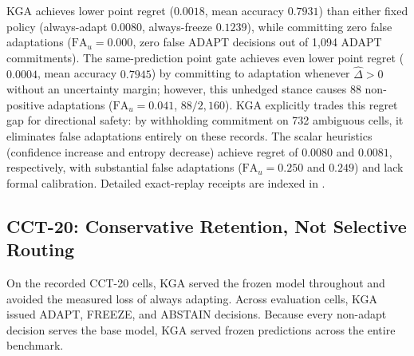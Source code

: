 \begin{table}[t]
\centering
\small
\caption{Current outcome-disjoint saved-feature comparison on 2,160 CIFAR-10-C
Tent rows, generated from one authenticated paired-score authority. All rows
have the same oracle and weights; both fitted gates use identical predictions.
Lower regret is better. $\mathrm{FA}_{\mathrm u}$ is the fraction of all rows
with ADAPT and $B\le0$; commitment is $(A+F)/n$.}
\label{tab:synchronized-baselines}
\resizebox{\textwidth}{!}{}
\end{table}

KGA achieves lower point regret ($0.0018$, mean accuracy $0.7931$) than either fixed policy
(always-adapt $0.0080$, always-freeze $0.1239$), while committing zero false adaptations
($\mathrm{FA}_u = 0.000$, zero false ADAPT decisions out of 1{,}094 ADAPT commitments).
The same-prediction point gate achieves even lower point regret ($0.0004$, mean accuracy $0.7945$)
by committing to adaptation whenever $\widehat\Delta > 0$ without an uncertainty margin;
however, this unhedged stance causes 88 non-positive adaptations ($\mathrm{FA}_u = 0.041$,
$88/2{,}160$). KGA explicitly trades this regret gap for directional safety: by withholding
commitment on 732 ambiguous cells, it eliminates false adaptations entirely on these records.
The scalar heuristics (confidence increase and entropy decrease) achieve regret of $0.0080$ and $0.0081$,
respectively, with substantial false adaptations ($\mathrm{FA}_u = 0.250$ and $0.249$) and lack formal calibration.
Detailed exact-replay receipts are indexed in .

\subsection{CCT-20: Conservative Retention, Not Selective Routing}
\label{sec:cct20-result}

On the recorded CCT-20 cells, KGA served the frozen model throughout and avoided the measured loss of always adapting.
Across \CCTCellCount{} evaluation cells, KGA issued \CCTAdaptCount{} ADAPT, \CCTFreezeCount{} FREEZE,
and \CCTAbstainCount{} ABSTAIN decisions. Because every non-adapt decision serves the base
model, KGA served frozen predictions across the entire benchmark.

\begin{table}[t]
\centering
\footnotesize
\caption{CCT-20 safe-utility endpoint defined in Eq.~\eqref{eq:cct-safe-utility}.
Contrasts are baseline regret minus KGA regret on the set-membership accuracy-proportion scale.
Contrasts report nominal pointwise 95\% two-way bootstrap intervals.
Location-level records are detailed in the supplement.}
\label{tab:cct20-safe-utility}

\end{table}

